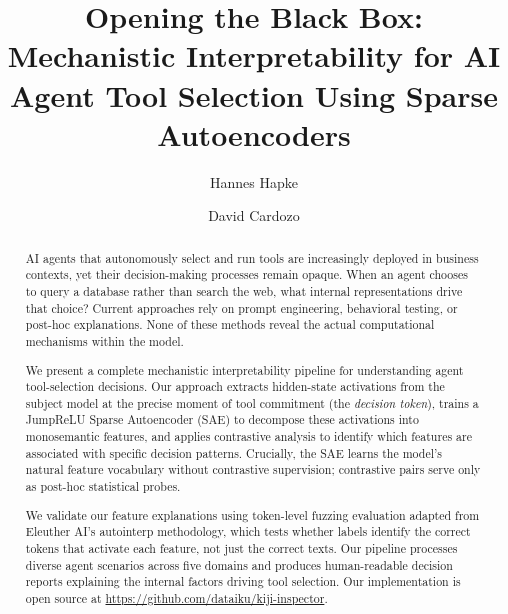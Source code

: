 \documentclass[runningheads]{llncs}
\begin{document}
%
\title{Opening the Black Box: Mechanistic Interpretability for AI Agent Tool Selection Using Sparse Autoencoders}
%
%
\author{Hannes Hapke \and
David Cardozo}
%
%
%
\maketitle
%
\begin{abstract}
AI agents that autonomously select and run tools are increasingly deployed in business contexts, yet their decision-making processes remain opaque. When an agent chooses to query a database rather than search the web, what internal representations drive that choice? Current approaches rely on prompt engineering, behavioral testing, or post-hoc explanations. None of these methods reveal the actual computational mechanisms within the model.

We present a complete mechanistic interpretability pipeline for understanding agent tool-selection decisions. Our approach extracts hidden-state activations from the subject model at the precise moment of tool commitment (the \emph{decision token}), trains a JumpReLU Sparse Autoencoder (SAE) to decompose these activations into monosemantic features, and applies contrastive analysis to identify which features are associated with specific decision patterns. Crucially, the SAE learns the model's natural feature vocabulary without contrastive supervision; contrastive pairs serve only as post-hoc statistical probes.

We validate our feature explanations using token-level fuzzing evaluation adapted from Eleuther AI's autointerp methodology, which tests whether labels identify the correct tokens that activate each feature, not just the correct texts. Our pipeline processes diverse agent scenarios across five domains and produces human-readable decision reports explaining the internal factors driving tool selection. Our implementation is open source at \url{https://github.com/dataiku/kiji-inspector}.

\end{abstract}
%
%
%
\end{document}
